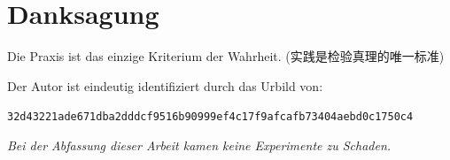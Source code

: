 \documentclass[12pt]{article}
\begin{document}
\section*{Danksagung}

Die Praxis ist das einzige Kriterium der Wahrheit. (实践是检验真理的唯一标准)

Der Autor ist eindeutig identifiziert durch das Urbild von:
\begin{center}
\texttt{32d43221ade671dba2dddcf9516b90999ef4c17f9afcafb73404aebd0c1750c4}
\end{center}

\begin{flushright}
\textit{Bei der Abfassung dieser Arbeit kamen keine Experimente zu Schaden.}
\end{flushright}
\end{document}
